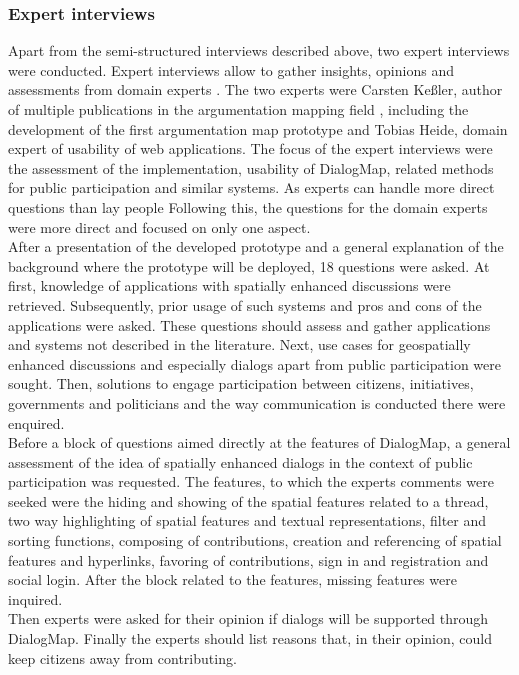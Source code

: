 \subsubsection{Expert interviews}

Apart from the semi-structured interviews described above, two expert interviews were conducted. Expert interviews allow to gather insights, opinions and assessments from domain experts \cite{hopf20045}. The two experts were Carsten Ke{\ss}ler, author of multiple publications in the argumentation mapping field \cite{Kessler2005_ArgumentationMapPrototype,kessler_argumap,Kessler2005_Conflict_Resolution}, including the development of the first argumentation map prototype and Tobias Heide, domain expert of usability of web applications. The focus of the expert interviews were the assessment of the implementation, usability of DialogMap, related methods for public participation and similar systems. As experts can handle more direct questions than lay people \cite{helfferich2005} Following this, the questions for the domain experts were more direct and focused on only one aspect.\\
After a presentation of the developed prototype and a general explanation of the background where the prototype will be deployed, 18 questions were asked. At first, knowledge of applications with spatially enhanced discussions were retrieved. Subsequently, prior usage of such systems and pros and cons of the applications were asked. These questions should assess and gather applications and systems not described in the literature. Next, use cases for geospatially enhanced discussions and especially dialogs apart from public participation were sought. Then, solutions to engage participation between citizens, initiatives, governments and politicians and the way communication is conducted there were enquired.\\
Before a block of questions aimed directly at the features of DialogMap, a general assessment of the idea of spatially enhanced dialogs in the context of public participation was requested. The features, to which the experts comments were seeked were the hiding and showing of the spatial features related to a thread, two way highlighting of spatial features and textual representations, filter and sorting functions, composing of contributions, creation and referencing of spatial features and hyperlinks, favoring of contributions, sign in and registration and social login. After the block related to the features, missing features were inquired.\\
Then experts were asked for their opinion if dialogs will be supported through DialogMap. Finally the experts should list reasons that, in their opinion, could keep citizens away from contributing.

